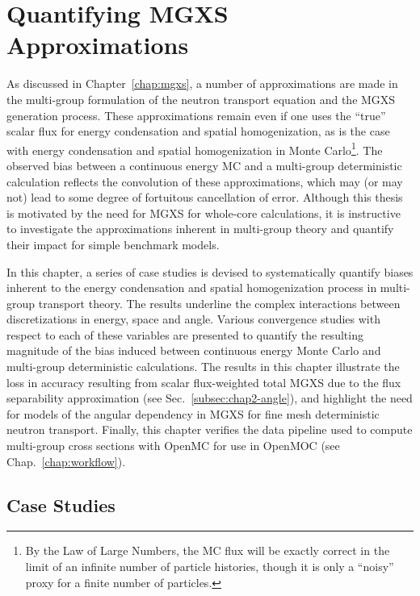 \chapter{Quantifying MGXS Approximations}
\label{chap:biases}

As discussed in Chapter~\ref{chap:mgxs}, a number of approximations are made in the multi-group formulation of the neutron transport equation and the \ac{MGXS} generation process. These approximations remain even if one uses the ``true'' scalar flux for energy condensation and spatial homogenization, as is the case with energy condensation and spatial homogenization in Monte Carlo\footnote{By the Law of Large Numbers, the \ac{MC} flux will be exactly correct in the limit of an infinite number of particle histories, though it is only a ``noisy'' proxy for a finite number of particles.}. The observed bias between a continuous energy \ac{MC} and a multi-group deterministic calculation reflects the convolution of these approximations, which may (or may not) lead to some degree of fortuitous cancellation of error. Although this thesis is motivated by the need for \ac{MGXS} for whole-core calculations, it is instructive to investigate the approximations inherent in multi-group theory and quantify their impact for simple benchmark models.

In this chapter, a series of case studies is devised to systematically quantify biases inherent to the energy condensation and spatial homogenization process in multi-group transport theory. The results underline the complex interactions between discretizations in energy, space and angle. Various convergence studies with respect to each of these variables are presented to quantify the resulting magnitude of the bias induced between continuous energy Monte Carlo and multi-group deterministic calculations. The results in this chapter illustrate the loss in accuracy resulting from scalar flux-weighted total \ac{MGXS} due to the flux separability approximation (see Sec.~\ref{subsec:chap2-angle}), and highlight the need for models of the angular dependency in \ac{MGXS} for fine mesh deterministic neutron transport. Finally, this chapter verifies the data pipeline used to compute multi-group cross sections with OpenMC for use in OpenMOC (see Chap.~\ref{chap:workflow}).


\section{Case Studies}
\label{sec:chap5-case-studies}


